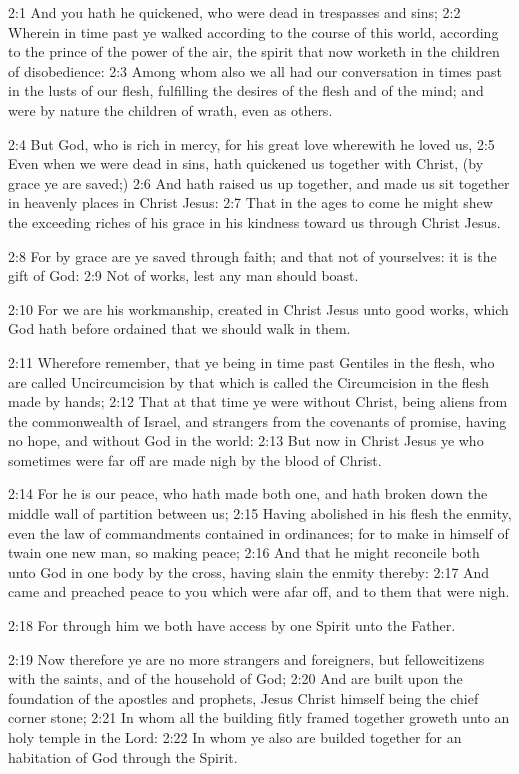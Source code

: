 2:1 And you hath he quickened, who were dead in trespasses and sins; 2:2 Wherein in time past ye walked according to the course of this world, according to the prince of the power of the air, the spirit that now worketh in the children of disobedience: 2:3 Among whom also we all had our conversation in times past in the lusts of our flesh, fulfilling the desires of the flesh and of the mind; and were by nature the children of wrath, even as others.

2:4 But God, who is rich in mercy, for his great love wherewith he loved us, 2:5 Even when we were dead in sins, hath quickened us together with Christ, (by grace ye are saved;) 2:6 And hath raised us up together, and made us sit together in heavenly places in Christ Jesus: 2:7 That in the ages to come he might shew the exceeding riches of his grace in his kindness toward us through Christ Jesus.

2:8 For by grace are ye saved through faith; and that not of yourselves: it is the gift of God: 2:9 Not of works, lest any man should boast.

2:10 For we are his workmanship, created in Christ Jesus unto good works, which God hath before ordained that we should walk in them.

2:11 Wherefore remember, that ye being in time past Gentiles in the flesh, who are called Uncircumcision by that which is called the Circumcision in the flesh made by hands; 2:12 That at that time ye were without Christ, being aliens from the commonwealth of Israel, and strangers from the covenants of promise, having no hope, and without God in the world: 2:13 But now in Christ Jesus ye who sometimes were far off are made nigh by the blood of Christ.

2:14 For he is our peace, who hath made both one, and hath broken down the middle wall of partition between us; 2:15 Having abolished in his flesh the enmity, even the law of commandments contained in ordinances; for to make in himself of twain one new man, so making peace; 2:16 And that he might reconcile both unto God in one body by the cross, having slain the enmity thereby: 2:17 And came and preached peace to you which were afar off, and to them that were nigh.

2:18 For through him we both have access by one Spirit unto the Father.

2:19 Now therefore ye are no more strangers and foreigners, but fellowcitizens with the saints, and of the household of God; 2:20 And are built upon the foundation of the apostles and prophets, Jesus Christ himself being the chief corner stone; 2:21 In whom all the building fitly framed together groweth unto an holy temple in the Lord: 2:22 In whom ye also are builded together for an habitation of God through the Spirit.

